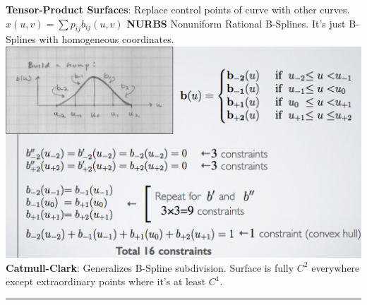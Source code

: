 \documentclass[3pt,landscape]{article}
\begin{document}
\begin{multicols}{3}
{\bf Tensor-Product Surfaces}: Replace control points of curve with other curves. $x(u,v)=\sum p_{ij}b_{ij}(u,v)$
{\bf NURBS} Nonuniform Rational B-Splines. It's just B-Splines with homogeneous coordinates.
\includegraphics[scale=0.20]{images/bspline}\\
{\bf Catmull-Clark}: Generalizes B-Spline subdivision. Surface is fully $C^2$ everywhere except extraordinary points where it's at least $C^1$.



\rule{0.3\linewidth}{0.25pt}
\newpage
\scriptsize


\end{multicols}
\end{document}
